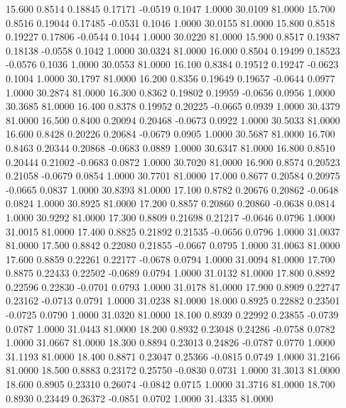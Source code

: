  15.600   0.8514   0.18845   0.17171  -0.0519   0.1047   1.0000  30.0109  81.0000
  15.700   0.8516   0.19044   0.17485  -0.0531   0.1046   1.0000  30.0155  81.0000
  15.800   0.8518   0.19227   0.17806  -0.0544   0.1044   1.0000  30.0220  81.0000
  15.900   0.8517   0.19387   0.18138  -0.0558   0.1042   1.0000  30.0324  81.0000
  16.000   0.8504   0.19499   0.18523  -0.0576   0.1036   1.0000  30.0553  81.0000
  16.100   0.8384   0.19512   0.19247  -0.0623   0.1004   1.0000  30.1797  81.0000
  16.200   0.8356   0.19649   0.19657  -0.0644   0.0977   1.0000  30.2874  81.0000
  16.300   0.8362   0.19802   0.19959  -0.0656   0.0956   1.0000  30.3685  81.0000
  16.400   0.8378   0.19952   0.20225  -0.0665   0.0939   1.0000  30.4379  81.0000
  16.500   0.8400   0.20094   0.20468  -0.0673   0.0922   1.0000  30.5033  81.0000
  16.600   0.8428   0.20226   0.20684  -0.0679   0.0905   1.0000  30.5687  81.0000
  16.700   0.8463   0.20344   0.20868  -0.0683   0.0889   1.0000  30.6347  81.0000
  16.800   0.8510   0.20444   0.21002  -0.0683   0.0872   1.0000  30.7020  81.0000
  16.900   0.8574   0.20523   0.21058  -0.0679   0.0854   1.0000  30.7701  81.0000
  17.000   0.8677   0.20584   0.20975  -0.0665   0.0837   1.0000  30.8393  81.0000
  17.100   0.8782   0.20676   0.20862  -0.0648   0.0824   1.0000  30.8925  81.0000
  17.200   0.8857   0.20860   0.20860  -0.0638   0.0814   1.0000  30.9292  81.0000
  17.300   0.8809   0.21698   0.21217  -0.0646   0.0796   1.0000  31.0015  81.0000
  17.400   0.8825   0.21892   0.21535  -0.0656   0.0796   1.0000  31.0037  81.0000
  17.500   0.8842   0.22080   0.21855  -0.0667   0.0795   1.0000  31.0063  81.0000
  17.600   0.8859   0.22261   0.22177  -0.0678   0.0794   1.0000  31.0094  81.0000
  17.700   0.8875   0.22433   0.22502  -0.0689   0.0794   1.0000  31.0132  81.0000
  17.800   0.8892   0.22596   0.22830  -0.0701   0.0793   1.0000  31.0178  81.0000
  17.900   0.8909   0.22747   0.23162  -0.0713   0.0791   1.0000  31.0238  81.0000
  18.000   0.8925   0.22882   0.23501  -0.0725   0.0790   1.0000  31.0320  81.0000
  18.100   0.8939   0.22992   0.23855  -0.0739   0.0787   1.0000  31.0443  81.0000
  18.200   0.8932   0.23048   0.24286  -0.0758   0.0782   1.0000  31.0667  81.0000
  18.300   0.8894   0.23013   0.24826  -0.0787   0.0770   1.0000  31.1193  81.0000
  18.400   0.8871   0.23047   0.25366  -0.0815   0.0749   1.0000  31.2166  81.0000
  18.500   0.8883   0.23172   0.25750  -0.0830   0.0731   1.0000  31.3013  81.0000
  18.600   0.8905   0.23310   0.26074  -0.0842   0.0715   1.0000  31.3716  81.0000
  18.700   0.8930   0.23449   0.26372  -0.0851   0.0702   1.0000  31.4335  81.0000
